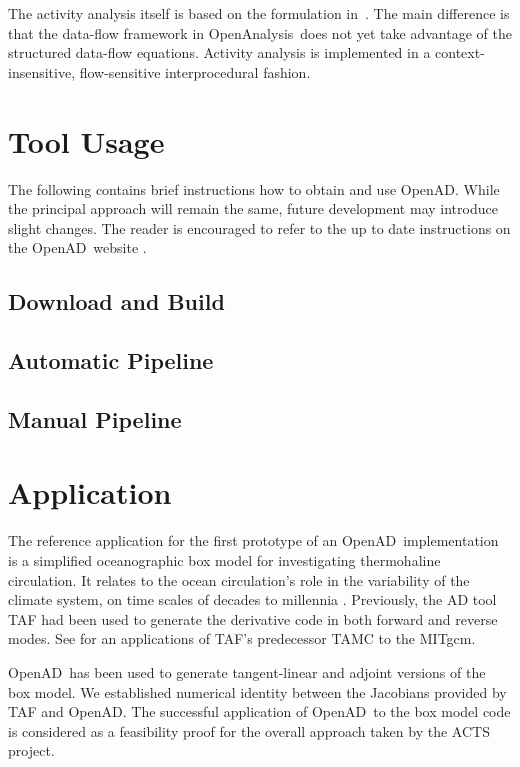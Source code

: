 \documentclass[acmtocl,acmnow]{acmtrans2m}
\newcommand{\OpenAD}{OpenAD}
\newcommand{\OpenAnalysis}{OpenAnalysis}
\begin{document}
The activity analysis itself is based on the formulation in~\cite{UweTBRPaper}.
The main difference is that the data-flow framework in \OpenAnalysis\ does not
yet take advantage of the structured data-flow equations.  Activity analysis is
implemented in a context-insensitive, flow-sensitive interprocedural fashion.


\section{Tool Usage}
The following contains brief instructions how to obtain and use \OpenAD. 
While the principal approach will remain the same, future development may 
introduce slight changes. The reader is encouraged to refer to the 
up to date instructions on the \OpenAD\ website \cite{openadWeb}.
\subsection{Download and Build} 
\subsection{Automatic Pipeline}
\subsection{Manual Pipeline}\label{ssec:manualPipeline}


\section{Application}

The reference application for the first prototype of an \OpenAD\ implementation
is a simplified oceanographic box model for investigating
thermohaline circulation. It relates to the
ocean circulation's role in the variability of the climate system,
on time scales of decades to millennia \cite{tzi-ioa:02}.
Previously, the AD tool TAF \cite{GiKa02} 
had been used to generate the derivative
code in both forward and reverse modes.
See \cite{maro-eta:99} for an applications of
TAF's predecessor TAMC to the MITgcm.

\OpenAD\ has been used to generate tangent-linear and 
adjoint versions of the box model. We established numerical identity between
the Jacobians provided by TAF and \OpenAD.
The successful 
application of \OpenAD\ to the box model code is considered as a feasibility 
proof for the overall approach taken by the ACTS project.  
\end{document}
